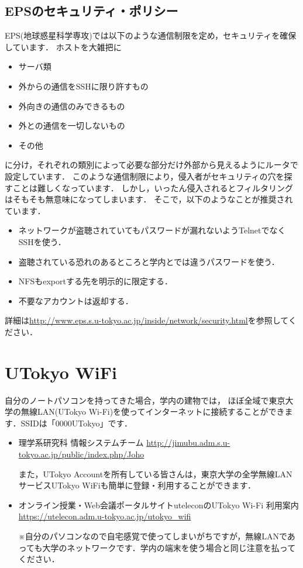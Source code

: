\documentclass{jarticle}
\begin{document}
\subsection{EPSのセキュリティ・ポリシー}
EPS(地球惑星科学専攻)では以下のような通信制限を定め，セキュリティを確保しています． ホストを大雑把に
\begin{itemize}
\item サーバ類
\item 外からの通信をSSHに限り許すもの
\item 外向きの通信のみできるもの
\item 外との通信を一切しないもの
\item その他
\end{itemize}
に分け，それぞれの類別によって必要な部分だけ外部から見えるようにルータで設定しています．
このような通信制限により，侵入者がセキュリティの穴を探すことは難しくなっています．
しかし，いったん侵入されるとフィルタリングはそもそも無意味になってしまいます．
そこで，以下のようなことが推奨されています．
\begin{itemize}
\item ネットワークが盗聴されていてもパスワードが漏れないようTelnetでなくSSHを使う．
\item 盗聴されている恐れのあるところと学内とでは違うパスワードを使う．
\item NFSもexportする先を明示的に限定する．
\item 不要なアカウントは返却する．
\end{itemize}
詳細は\url{http://www.eps.s.u-tokyo.ac.jp/inside/network/security.html}を参照してください．

\section{UTokyo WiFi}
自分のノートパソコンを持ってきた場合，学内の建物では，
ほぼ全域で東京大学の無線LAN(UTokyo Wi-Fi)を使ってインターネットに接続することができます．SSIDは「0000UTokyo」です．

\begin{itemize}
\item 理学系研究科 情報システムチーム
\url{http://jimubu.adm.s.u-tokyo.ac.jp/public/index.php/Joho}

また，UTokyo Accountを所有している皆さんは，東京大学の全学無線LANサービスUTokyo WiFiも簡単に登録・利用することができます．

\item オンライン授業・Web会議ポータルサイトuteleconのUTokyo Wi-Fi 利用案内\\
\url{https://utelecon.adm.u-tokyo.ac.jp/utokyo_wifi}
 
 ※自分のパソコンなので自宅感覚で使ってしまいがちですが，無線LANであっても大学のネットワークです．学内の端末を使う場合と同じ注意を払ってください．
\end{itemize}
\end{document}
